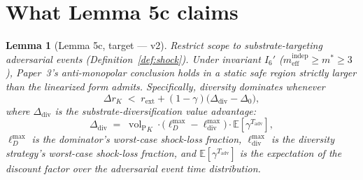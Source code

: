 \documentclass{article}
\newtheorem{lemma}{Lemma}
\DeclareMathOperator{\vol}{vol}
\newcommand{\volL}{{\vol_{\mathrm{P}}}}
\newcommand{\rext}{r_{\mathrm{ext}}}
\newcommand{\mindep}{m_{\mathrm{eff}}^{\mathrm{indep}}}
\newcommand{\Tadv}{T_{\mathrm{adv}}}
\newcommand{\Ddiv}{\Delta_{\mathrm{div}}}
\newcommand{\pshock}{p_{\mathrm{shock}}}
\newcommand{\lossDmax}{\ell_D^{\max}}
\newcommand{\lossdivmax}{\ell_{\mathrm{div}}^{\max}}
\begin{document}
\begin{abstract}
Other v4 cleanups:
\begin{itemize}
\item Single-shock reduction tightened from ``$T_i = \infty$ for
  $i \geq 2$ with negligible probability'' to formal $N = 1$ a.s.
  (Round~C Q1).
\item $\pshock$ reframed as continuous-time Poisson rate $\lambda$
  rather than per-period probability (Round~C Q3); $\kappa$ formula
  changes if a discrete-time model is used.
\item The closed form for $\Ddiv^{\mathrm{multi}}$ at $\kappa = 1$
  has a removable singularity (Round~C Q3); the regime condition for
  non-trivial safe region is $\kappa < 1 - \delta$ for some $\delta$,
  not $\pshock$ bounded.
\item Abstract regression fixed (v3 abstract still referenced
  $A_{\mathrm{multi}}$ survival-stream; v4 abstract reflects
  marginal-loss formulation).
\end{itemize}

Status: v4's single-shock form is citeable (per Round~B). v4's
multi-shock form is citeable in the cooperative-overlap regime (per
Round~C with v4's scope restriction). Sequential counterfactual
derivation for the redundancy regime is named as open work.
\end{abstract}

\section{What Lemma 5c claims}

\begin{lemma}[Lemma 5c, target --- v2]
\label{lem:5c_target}
Restrict scope to substrate-targeting adversarial events
(Definition~\ref{def:shock}).  Under invariant $I_6'$ ($\mindep \geq
m^* \geq 3$), Paper~3's anti-monopolar conclusion holds in a static
safe region strictly larger than the linearized form admits.
Specifically, diversity dominates whenever
\begin{equation}
\label{eq:safe_region}
\Delta r_K \;<\; \rext + (1 - \gamma)\bigl(\Ddiv - \Delta_0\bigr),
\end{equation}
where $\Ddiv$ is the substrate-diversification value advantage:
\begin{equation}
\label{eq:ddiv_definition}
\Ddiv \;=\; \volL_K \cdot \bigl(\lossDmax - \lossdivmax\bigr) \cdot
\mathbb{E}\!\left[\gamma^{\Tadv}\right],
\end{equation}
$\lossDmax$ is the dominator's worst-case shock-loss fraction,
$\lossdivmax$ is the diversity strategy's worst-case shock-loss
fraction, and $\mathbb{E}[\gamma^{\Tadv}]$ is the expectation of the
discount factor over the adversarial event time distribution.
\end{lemma}
\end{document}
